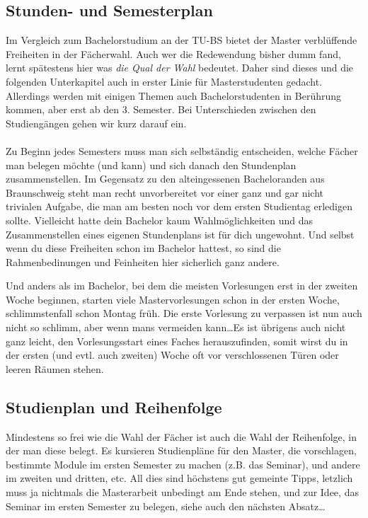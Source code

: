 \subsection{Stunden- und Semesterplan}
 
Im Vergleich zum Bachelorstudium an der TU-BS bietet der Master
verblüffende Freiheiten in der Fächerwahl. Auch wer die Redewendung
bisher dumm fand, lernt spätestens hier was \emph{die Qual der Wahl}
bedeutet. Daher sind dieses und die folgenden Unterkapitel auch in erster
Linie für Masterstudenten gedacht. Allerdings werden mit einigen
Themen auch Bachelorstudenten in Berührung kommen, aber erst ab den
3. Semester. Bei Unterschieden zwischen den Studiengängen gehen wir
kurz darauf ein.\\\\
Zu Beginn jedes Semesters muss man sich selbständig entscheiden, welche Fächer man belegen möchte (und kann) und sich danach den Stundenplan zusammenstellen. Im Gegensatz zu den alteingessenen Bacheloranden aus Braunschweig steht man recht unvorbereitet vor einer ganz und gar nicht trivialen Aufgabe, die man am besten noch vor dem ersten Studientag erledigen sollte. Vielleicht hatte dein Bachelor kaum Wahlmöglichkeiten und das Zusammenstellen eines eigenen Stundenplans ist für dich ungewohnt. Und selbst wenn du diese Freiheiten schon im Bachelor hattest, so sind die Rahmenbedinungen und Feinheiten hier sicherlich ganz andere.

Und anders als im Bachelor, bei dem die meisten Vorlesungen erst in der zweiten Woche beginnen, starten viele Mastervorlesungen schon in der ersten Woche, schlimmstenfall schon Montag früh. Die erste Vorlesung zu verpassen ist nun auch nicht so schlimm, aber wenn mans vermeiden kann\ldots Es ist übrigens auch nicht ganz leicht, den Vorlesungsstart eines Faches herauszufinden, somit wirst du in der ersten (und evtl. auch zweiten) Woche oft vor verschlossenen Türen oder leeren Räumen stehen.







\subsection{Studienplan und Reihenfolge}
Mindestens so frei wie die Wahl der Fächer ist auch die Wahl der Reihenfolge, in der man diese belegt. Es kursieren Studienpläne für den Master, die vorschlagen, bestimmte Module im ersten Semester zu machen (z.B. das Seminar), und andere im zweiten und dritten, etc. All dies sind höchstens gut gemeinte Tipps, letzlich muss ja nichtmals die Masterarbeit unbedingt am Ende stehen, und zur Idee, das Seminar im ersten Semester zu belegen, siehe auch den nächsten Absatz\ldots
          



